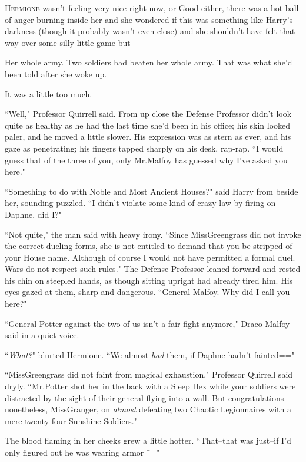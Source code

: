 
\lettrine{H}{ermione} wasn't feeling very nice right now, or Good either, there was a hot ball of anger burning inside her and she wondered if this was something like Harry's darkness (though it probably wasn't even close) and she shouldn't have felt that way over some silly little game but\---

Her whole army. Two soldiers had beaten her whole army. That was what she'd been told after she woke up.

It was a little too much.

``Well," Professor Quirrell said. From up close the Defense Professor didn't look quite as healthy as he had the last time she'd been in his office; his skin looked paler, and he moved a little slower. His expression was as stern as ever, and his gaze as penetrating; his fingers tapped sharply on his desk, rap-rap. ``I would guess that of the three of you, only Mr.\?Malfoy has guessed why I've asked you here."

``Something to do with Noble and Most Ancient Houses?" said Harry from beside her, sounding puzzled. ``I didn't violate some kind of crazy law by firing on Daphne, did I?"

``Not quite," the man said with heavy irony. ``Since Miss\?Greengrass did not invoke the correct dueling forms, she is not entitled to demand that you be stripped of your House name. Although of course I would not have permitted a formal duel. Wars do not respect such rules." The Defense Professor leaned forward and rested his chin on steepled hands, as though sitting upright had already tired him. His eyes gazed at them, sharp and dangerous. ``General Malfoy. Why did I call you here?"

``General Potter against the two of us isn't a fair fight anymore," Draco Malfoy said in a quiet voice.

``\emph{What?}" blurted Hermione. ``We almost \emph{had} them, if Daphne hadn't fainted\==="

``Miss\?Greengrass did not faint from magical exhaustion," Professor Quirrell said dryly. ``Mr.\?Potter shot her in the back with a Sleep Hex while your soldiers were distracted by the sight of their general flying into a wall. But congratulations nonetheless, Miss\?Granger, on \emph{almost} defeating two Chaotic Legionnaires with a mere twenty-four Sunshine Soldiers."

The blood flaming in her cheeks grew a little hotter. ``That\---that was just\---if I'd only figured out he was wearing armor\==="

